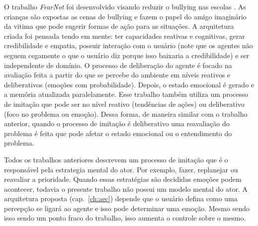 O trabalho \emph{FearNot} foi desenvolvido visando reduzir o bullying nas
escolas \cite{dias2005feeling}. As crianças são expostas as cenas de bullying
e fazem o papel do amigo imaginário da vitima que pode sugerir formas de ação
para as situações. A arquitetura criada foi pensada tendo em
mente: ter capacidades reativas e cognitivas, gerar credibilidade e empatia,
possuir interação com o usuário (note que os agentes não seguem cegamente o que
o usuário diz porque isso baixaria a credibilidade) e ser independente de
domínio.
%
O processo de deliberação do agente é focado na avaliação feita a partir do
que se percebe do ambiente em níveis reativos e deliberativos (emoções com
probabilidade). Depois, o estado emocional é gerado e a memória atualizada
paralelamente. Esse trabalho também utiliza um processo de imitação que pode
ser no nível reativo (tendências de ações) ou deliberativo (foco no problema
ou emoção). Dessa forma, de maneira similar com o trabalho anterior, quando o
processo de imitação é deliberativo uma reavaliação do problema é feita que
pode afetar o estado emocional ou o entendimento do problema.

Todos os trabalhos anteriores descrevem um processo de imitação que é o
responsável pela estrategia mental do ator. Por exemplo, fazer, replanejar ou
reavaliar a prioridade. Quando essas estratégias são decididas emoções podem
acontecer, todavia o presente trabalho não possui um modelo mental do ator. A
arquitetura proposta (cap.~\ref{ch:aec}) depende que o usuário defina como uma percepção se ligará
ao agente e isso pode determinar uma emoção. Mesmo sendo isso sendo um ponto
fraco do trabalho, isso aumenta o controle sobre o mesmo.

